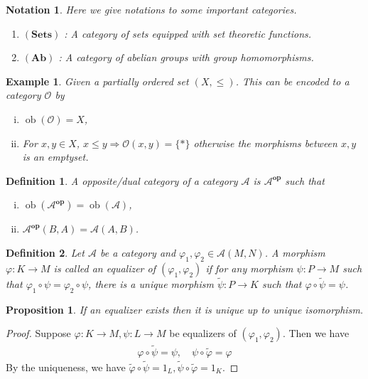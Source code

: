 \documentclass{article}
\newtheorem{proposition}{Proposition}[section]
\newtheorem{definition}{Definition}[section]
\newtheorem{notation}{Notation}[section]
\newtheorem{example}{Example}[section]
\numberwithin{equation}{section}
\DeclareMathOperator{\ob}{ob}
\begin{document}
\begin{notation}
Here we give notations to some important categories.
\begin{enumerate}[\textbullet]
\item $(\mathbf{Sets})$ : A category of sets equipped with set theoretic functions.
\item $(\mathbf{Ab})$ : A category of abelian groups with group homomorphisms.
\end{enumerate}
\end{notation}

\begin{example}
\label{order_category}
Given a partially ordered set $(X,\leq)$. This can be encoded to a category $\mathcal{O}$ by
\begin{enumerate}[i).]
\item $\ob(\mathcal{O}) = X$,
\item For $x,y\in X$, $x\leq y\Rightarrow\mathcal{O}(x,y) = \{*\}$ otherwise the morphisms between $x,y$ is an emptyset.
\end{enumerate}
\end{example}

\begin{definition}
A opposite/dual category of a category $\mathcal{A}$ is $\mathcal{A}^{\textbf{op}}$ such that
\begin{enumerate}[i).]
\item $\ob(\mathcal{A}^{\textbf{op}})=\ob(\mathcal{A})$,
\item $\mathcal{A}^{\textbf{op}}(B,A) = \mathcal{A}(A,B)$.
\end{enumerate}
\end{definition}

\begin{definition}
Let $\mathcal{A}$ be a category and $\varphi_1,\varphi_2\in\mathcal{A}(M,N)$. A morphism $\varphi:K\to M$ is called an equalizer of $(\varphi_1,\varphi_2)$ if for any morphism $\psi:P\to M$ such that
$\varphi_1\circ\psi=\varphi_2\circ\psi$, there is a unique morphism $\tilde{\psi}:P\to K$ such that $\varphi\circ\tilde{\psi}=\psi$.
\end{definition}

\begin{proposition}
If an equalizer exists then it is unique up to unique isomorphism.
\end{proposition}

\begin{proof}
Suppose $\varphi:K\to M,\psi:L\to M$ be equalizers of $(\varphi_1,\varphi_2)$. Then we have
\begin{align*}
\varphi\circ\tilde{\psi}=\psi,\quad\psi\circ\tilde{\varphi}=\varphi
\end{align*}
By the uniqueness, we have $\tilde{\varphi}\circ\tilde{\psi} = 1_L,\tilde{\psi}\circ\tilde{\varphi} = 1_K$. 
\end{proof}
\end{document}
